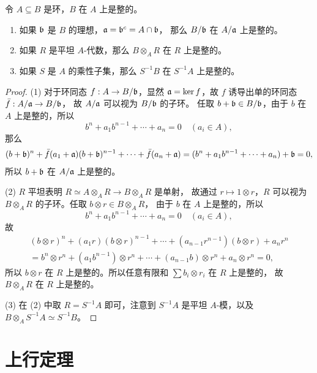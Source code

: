 \begin{proposition}\label{prop:quotient preserve integral dependence}
  令 $A\subseteq B$ 是环，$B$ 在 $A$ 上是整的。
  \begin{enumerate}
    \item 如果 $\mathfrak{b}$ 是 $B$ 的理想，$\mathfrak{a}=\mathfrak{b}^c=A\cap\mathfrak{b}$，
    那么 $B/\mathfrak{b}$ 在 $A/\mathfrak{a}$ 上是整的。
    \item 如果 $R$ 是平坦 $A$-代数，那么 $B\otimes_AR$ 在 $R$ 上是整的。
    \item 如果 $S$ 是 $A$ 的乘性子集，那么 $S^{-1}B$ 在 $S^{-1}A$ 上是整的。
  \end{enumerate}
\end{proposition}
\begin{proof}
  (1) 对于环同态 $f:A\to B/\mathfrak{b}$，显然 $\mathfrak{a}=\ker f$，故
  $f$ 诱导出单的环同态 $\bar f:A/\mathfrak{a}\to B/\mathfrak{b}$，
  故 $A/\mathfrak{a}$ 可以视为 $B/\mathfrak{b}$ 的子环。
  任取 $b+\mathfrak{b}\in B/\mathfrak{b}$，由于 $b$ 在 $A$ 上是整的，所以
  \[
    b^n+a_{1}b^{n-1}+\cdots+a_n=0\quad (a_i\in A),  
  \]
  那么
  \begin{align*}
    (b+\mathfrak{b})^n+\bar f(a_1+\mathfrak{a})(b+\mathfrak{b})^{n-1}+\cdots+\bar f(a_n+\mathfrak{a})=
    (b^n+a_{1}b^{n-1}+\cdots+a_n)+\mathfrak{b}=0,
  \end{align*}
  所以 $b+\mathfrak{b}$ 在 $A/\mathfrak{a}$ 上是整的。

  (2) $R$ 平坦表明 $R\simeq A\otimes_AR\to B\otimes_AR$ 是单射，
  故通过 $r\mapsto 1\otimes r$，$R$ 可以视为 $B\otimes_AR$ 的子环。任取 $b\otimes r\in B\otimes_AR$，
  由于 $b$ 在 $A$ 上是整的，所以
  \[
    b^n+a_{1}b^{n-1}+\cdots+a_n=0\quad (a_i\in A),  
  \]
  故
  \begin{gather*}
    (b\otimes r)^n+(a_1r)(b\otimes r)^{n-1}+\cdots+(a_{n-1}r^{n-1})(b\otimes r)+a_nr^n\\
    =b^n\otimes r^n+(a_1b^{n-1})\otimes r^n+\cdots+(a_{n-1}b)\otimes r^n+a_n\otimes r^n=0,
  \end{gather*}
  所以 $b\otimes r$ 在 $R$ 上是整的。所以任意有限和 $\sum b_i\otimes r_i$ 在 $R$ 上是整的，
  故 $B\otimes_AR$ 在 $R$ 上是整的。
  
  (3) 在 (2) 中取 $R=S^{-1}A$ 即可，注意到 $S^{-1}A$ 是平坦 $A$-模，以及
  $B\otimes_A S^{-1}A\simeq S^{-1}B$。
\end{proof}
      
\section{上行定理}


